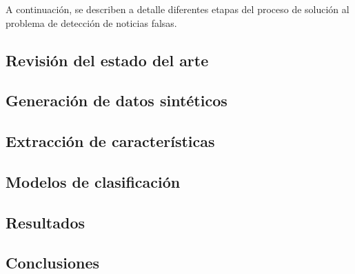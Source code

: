 A continuación, se describen a detalle diferentes etapas del proceso de solución al problema de detección de noticias falsas.

\subsection{Revisión del estado del arte}


\subsection{Generación de datos sintéticos}
\subsection{Extracción de características}
\subsection{Modelos de clasificación}
\subsection{Resultados}
\subsection{Conclusiones}